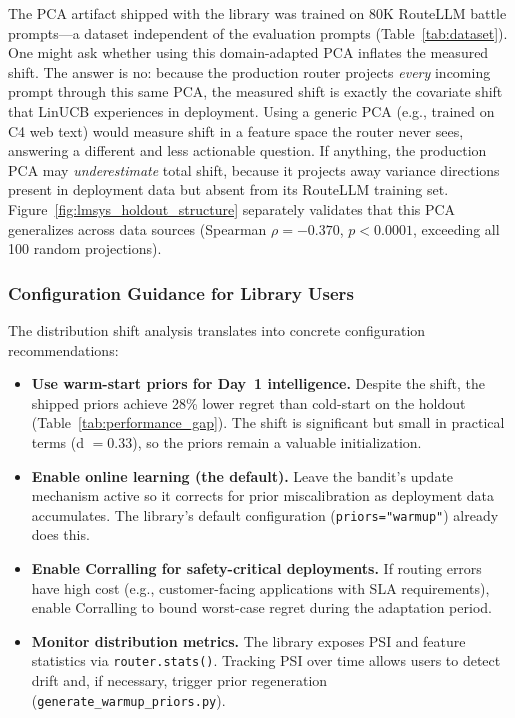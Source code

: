 The PCA artifact shipped with the library was trained on 80K RouteLLM battle prompts---a dataset independent of the evaluation prompts (Table~\ref{tab:dataset}). One might ask whether using this domain-adapted PCA inflates the measured shift. The answer is no: because the production router projects \emph{every} incoming prompt through this same PCA, the measured shift is exactly the covariate shift that LinUCB experiences in deployment. Using a generic PCA (e.g., trained on C4 web text) would measure shift in a feature space the router never sees, answering a different and less actionable question. If anything, the production PCA may \emph{underestimate} total shift, because it projects away variance directions present in deployment data but absent from its RouteLLM training set. Figure~\ref{fig:lmsys_holdout_structure} separately validates that this PCA generalizes across data sources (Spearman $\rho = -0.370$, $p < 0.0001$, exceeding all 100 random projections).

\subsubsection{Configuration Guidance for Library Users}

The distribution shift analysis translates into concrete configuration recommendations:

\begin{itemize}[leftmargin=*,noitemsep,topsep=2pt]
    \item \textbf{Use warm-start priors for Day~1 intelligence.} Despite the shift, the shipped priors achieve 28\% lower regret than cold-start on the holdout (Table~\ref{tab:performance_gap}). The shift is significant but small in practical terms (d $= 0.33$), so the priors remain a valuable initialization.
    \item \textbf{Enable online learning (the default).} Leave the bandit's update mechanism active so it corrects for prior miscalibration as deployment data accumulates. The library's default configuration (\texttt{priors="warmup"}) already does this.
    \item \textbf{Enable Corralling for safety-critical deployments.} If routing errors have high cost (e.g., customer-facing applications with SLA requirements), enable Corralling to bound worst-case regret during the adaptation period.
    \item \textbf{Monitor distribution metrics.} The library exposes PSI and feature statistics via \texttt{router.stats()}. Tracking PSI over time allows users to detect drift and, if necessary, trigger prior regeneration (\texttt{generate\_warmup\_priors.py}).
\end{itemize}

